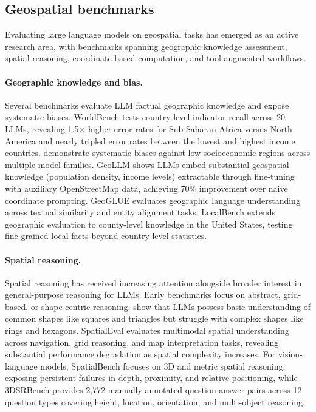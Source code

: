 \subsection{Geospatial benchmarks}

Evaluating large language models on geospatial tasks has emerged as an active research area, with benchmarks spanning geographic knowledge assessment, spatial reasoning, coordinate-based computation, and tool-augmented workflows.

\paragraph{Geographic knowledge and bias.}
Several benchmarks evaluate LLM factual geographic knowledge and expose systematic biases. WorldBench \citep{moayeri2024worldbench} tests country-level indicator recall across 20 LLMs, revealing 1.5$\times$ higher error rates for Sub-Saharan Africa versus North America and nearly tripled error rates between the lowest and highest income countries. \citet{manvi2024geographically} demonstrate systematic biases against low-socioeconomic regions across multiple model families. GeoLLM \citep{manvi2024geollm} shows LLMs embed substantial geospatial knowledge (population density, income levels) extractable through fine-tuning with auxiliary OpenStreetMap data, achieving 70\% improvement over naive coordinate prompting. GeoGLUE \citep{li2023geoglue} evaluates geographic language understanding across textual similarity and entity alignment tasks. LocalBench \citep{li2024localbench} extends geographic evaluation to county-level knowledge in the United States, testing fine-grained local facts beyond country-level statistics.

\paragraph{Spatial reasoning.}
Spatial reasoning has received increasing attention alongside broader interest in general-purpose reasoning for LLMs. Early benchmarks focus on abstract, grid-based, or shape-centric reasoning. \citet{yamada2024evaluating} show that LLMs possess basic understanding of common shapes like squares and triangles but struggle with complex shapes like rings and hexagons. SpatialEval \citep{wang2024spatial} evaluates multimodal spatial understanding across navigation, grid reasoning, and map interpretation tasks, revealing substantial performance degradation as spatial complexity increases. For vision-language models, SpatialBench \citep{xu2025spatialbench} focuses on 3D and metric spatial reasoning, exposing persistent failures in depth, proximity, and relative positioning, while 3DSRBench \citep{ma20243dsrbench} provides 2,772 manually annotated question-answer pairs across 12 question types covering height, location, orientation, and multi-object reasoning.


